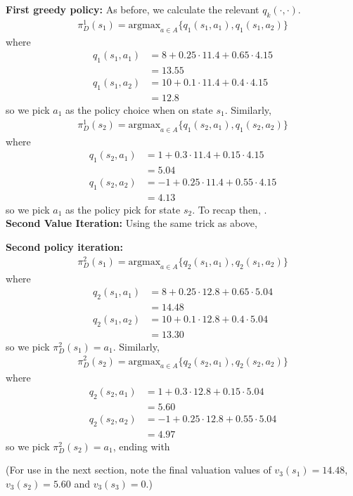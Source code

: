 \documentclass{article}
\begin{document}
\textbf{First greedy policy:} As before, we calculate the relevant $q_k(\cdot, \cdot)$.
\begin{align*}
	\pi_D^1(s_1) = \text{argmax}_{a\in A}\{q_1(s_1, a_1), q_1(s_1, a_2)\}
\end{align*}
where
\begin{align*}
	q_1(s_1, a_1) &= 8 + 0.25\cdot 11.4 + 0.65 \cdot 4.15\\
	&= 13.55\\
	q_1(s_1, a_2) &= 10 + 0.1\cdot 11.4 + 0.4\cdot 4.15\\
	&= 12.8
\end{align*}
so we pick $a_1$ as the policy choice when on state $s_1$. Similarly,
\begin{align*}
	\pi_D^1(s_2) = \text{argmax}_{a\in A}\{q_1(s_2, a_1), q_1(s_2, a_2)\}
\end{align*}
where
\begin{align*}
	q_1(s_2, a_1) &= 1 + 0.3\cdot 11.4 + 0.15 \cdot 4.15\\
	&= 5.04\\
	q_1(s_2, a_2) &= -1 + 0.25\cdot 11.4 + 0.55 \cdot 4.15\\
	&= 4.13
\end{align*}
so we pick $a_1$ as the policy pick for state $s_2$. To recap then, .\\

\textbf{Second Value Iteration:} Using the same trick as above,
\begin{center}
\end{center}
\textbf{Second policy iteration:}
\begin{align*}
	\pi_D^2(s_1) = \text{argmax}_{a\in A}\{q_2(s_1, a_1), q_2(s_1, a_2)\}
\end{align*}
where
\begin{align*}
	q_2(s_1, a_1) &= 8 + 0.25 \cdot 12.8 + 0.65 \cdot 5.04\\
	&= 14.48\\
	q_2(s_1, a_2) &= 10 + 0.1 \cdot 12.8 + 0.4 \cdot 5.04\\
	&= 13.30
\end{align*}
so we pick $\pi_D^2(s_1) = a_1$. Similarly,
\begin{align*}
	\pi_D^2(s_2) = \text{argmax}_{a\in A}\{q_2(s_2, a_1), q_2(s_2, a_2)\}
\end{align*}
where
\begin{align*}
	q_2(s_2, a_1) &= 1 + 0.3 \cdot 12.8 + 0.15 \cdot 5.04\\
	&= 5.60\\
	q_2(s_2, a_2) &= -1 + 0.25 \cdot 12.8 + 0.55\cdot 5.04\\
	&= 4.97
\end{align*}
so we pick $\pi_D^2(s_2) = a_1$, ending with
\begin{center}
\end{center}
(For use in the next section, note the final valuation values of $v_3(s_1) = 14.48$, $v_3(s_2) = 5.60$ and $v_3(s_3) = 0$.)
\end{document}
